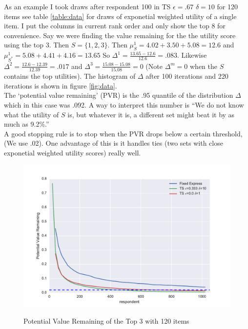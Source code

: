 \documentclass[mksc,blindrev]{informs3} %
\begin{document}
As an example I took draws after respondent 100 in TS $\epsilon=.67$ $\delta=10$ for 120 items see table \ref{table:data} for draws of exponetial weighted utility of a single item. I put the columns in current rank order and only show the top 8 for convenience. Say we were finding the value remaining for the the utility score using the top 3. Then $S=\{1,2,3\}$. Then $\mu^1_{S}=4.02+3.50+5.08=12.6$ and $\mu_{S^*}^{1}=5.08+4.41+4.16=13.65$ So $\Delta^{1}=\frac{13.65-12.6}{12.6}=.083$. Likewise $\Delta^{2}=\frac{12.6-12.39}{12.39}=.017$ and $\Delta^{3}=\frac{15.08-15.08}{15.08}=0$ (Note $\Delta^m=0$ when the $S$ contains the top utilities). The histogram of $\Delta$ after 100 iterations and 220 iterations is shown in figure \ref{fig:data}. \\
 The `potential value remaining' (PVR) is the .95 quantile of the distribution $\Delta$ which in this case was .092. A way to interpret this number is ``We do not know what the utility of $S$ is, but whatever it is, a different set might beat it by as much as 9.2\%.''\\
 A good stopping rule is to stop when the PVR drops below a certain threshold, (We use .02). One advantage of this is it handles ties (two sets with close exponetial weighted utility scores) really well. 
\begin{figure}
\caption{Potential Value Remaining of the Top 3 with 120 items}
\includegraphics[width=1\textwidth]{plots/3vr120show3ex.pdf}
\label{fig:3vr}
\end{figure}
\end{document}
